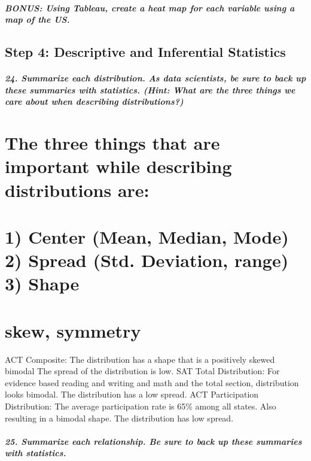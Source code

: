 \documentclass[11pt]{article}
\begin{document}
    \subparagraph{BONUS: Using Tableau, create a heat map for each variable
using a map of the
US.}\label{bonus-using-tableau-create-a-heat-map-for-each-variable-using-a-map-of-the-us.}

    \subsection{Step 4: Descriptive and Inferential
Statistics}\label{step-4-descriptive-and-inferential-statistics}

    \subparagraph{24. Summarize each distribution. As data scientists, be
sure to back up these summaries with statistics. (Hint: What are the
three things we care about when describing
distributions?)}\label{summarize-each-distribution.-as-data-scientists-be-sure-to-back-up-these-summaries-with-statistics.-hint-what-are-the-three-things-we-care-about-when-describing-distributions}

    \section{The three things that are important while describing
distributions
are:}\label{the-three-things-that-are-important-while-describing-distributions-are}

\section{1) Center (Mean, Median, Mode) 2) Spread (Std. Deviation,
range) 3)
Shape}\label{center-mean-median-mode-2-spread-std.-deviation-range-3-shape}

\section{skew, symmetry}\label{skew-symmetry}

ACT Composite: The distribution has a shape that is a positively skewed
bimodal The spread of the distribution is low. SAT Total Distribution:
For evidence based reading and writing and math and the total section,
distribution looks bimodal. The distribution has a low spread. ACT
Participation Distribution: The average participation rate is 65\% among
all states. Also resulting in a bimodal shape. The distribution has low
spread.

    \subparagraph{25. Summarize each relationship. Be sure to back up these
summaries with
statistics.}\label{summarize-each-relationship.-be-sure-to-back-up-these-summaries-with-statistics.}
\end{document}
